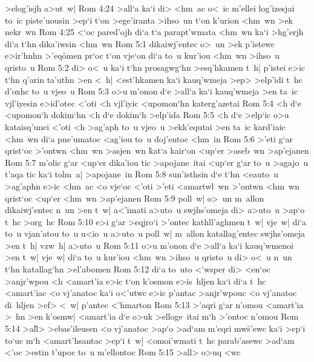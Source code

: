 >elog'isjh
a>ut~w|\bibvsend
\vs Rom 4:24
>all`a
ka`i
di>
<hm~ac
o<~ic
m'ellei
log'izesjai
to~ic
piste'uousin
>ep`i
t`on
>ege'iranta
>ihso~un
t`on
k'urion
<hm~wn
>ek
nekr~wn\bibvsend
\vs Rom 4:25
<`oc
pared'ojh
di`a
t`a
parapt'wmata
<hm~wn
ka`i
>hg'erjh
di`a
t`hn
dika'iwsin
<hm~wn\bibvsend
\vs Rom 5:1
dikaiwj'entec
o>~un
>ek
p'istewc
e>ir'hnhn
>'eq\r{o}men
pr`oc
t`on
vje`on
di`a
to~u
kur'iou
<hm~wn
>ihso~u
qristo~u\bibvsend
\vs Rom 5:2
di>
o<~u
ka`i
t`hn
prosagwg`hn
>esq'hkamen
t~h|
p'istei
e>ic
t`hn
q'arin
ta'uthn
>en
<~h|
<est'hkamen
ka`i
kauq'wmeja
>ep>
>elp'idi
t~hc
d'oxhc
to~u
vjeo~u\bibvsend
\vs Rom 5:3
o>u
m'onon
d`e
>all`a
ka`i
kauq'wmeja
>en
ta~ic
vjl'iyesin
e>id'otec
<'oti
<h
vjl'iyic
<upomon`hn
katerg'azetai\bibvsend
\vs Rom 5:4
<h
d`e
<upomon`h
dokim`hn
<h
d`e
dokim`h
>elp'ida\bibvsend
\vs Rom 5:5
<h
d`e
>elp`ic
o>u
kataisq'unei
<'oti
<h
>ag'aph
to~u
vjeo~u
>ekk'equtai
>en
ta~ic
kard'iaic
<hm~wn
di`a
pne'umatoc
<ag'iou
to~u
doj'entoc
<hm~in\bibvsend
\vs Rom 5:6
>'eti
g`ar
qrist`oc
>'ontwn
<hm~wn
>asjen~wn
\r{k}at`a
kair`on
<up`er
>aseb~wn
>ap'ejanen\bibvsend
\vs Rom 5:7
m'olic
g`ar
<up`er
dika'iou
tic
>apojane~itai
<up`er
g`ar
to~u
>agajo~u
t'aqa
tic
ka`i
tolm~a|
>apojane~in\bibvsend
\vs Rom 5:8
sun'isthsin
d`e
t`hn
<eauto~u
>ag'aphn
e>ic
<hm~ac
<o
vje`oc
<'oti
>'eti
<amartwl~wn
>'ontwn
<hm~wn
qrist`oc
<up`er
<hm~wn
>ap'ejanen\bibvsend
\vs Rom 5:9
poll~w|
o>~un
m~allon
dikaiwj'entec
n~un
>en
t~w|
a<'imati
a>uto~u
swjhs'omeja
di>
a>uto~u
>ap`o
t~hc
>org~hc\bibvsend
\vs Rom 5:10
e>i
g`ar
>eqjro`i
>'ontec
kathll'aghmen
t~w|
vje~w|
di`a
to~u
vjan'atou
to~u
u<io~u
a>uto~u
poll~w|
m~allon
katallag'entec
swjhs'omeja
>en
t~h|
vzw~h|
a>uto~u\bibvsend
\vs Rom 5:11
o>u
m'onon
d`e
>all`a
ka`i
kauq'wmenoi
>en
t~w|
vje~w|
di`a
to~u
kur'iou
<hm~wn
>ihso~u
qristo~u
di>
o<~u
n~un
t`hn
katallag`hn
>el'abomen\bibvsend
\vs Rom 5:12
di`a
to~uto
<'wsper
di>
<en`oc
>anjr'wpou
<h
<amart'ia
e>ic
t`on
k'osmon
e>is~hljen
ka`i
di`a
t~hc
<amart'iac
<o
vj'anatoc
ka`i
o<'utwc
e>ic
p'antac
>anjr'wpouc
<o
vj'anatoc
di~hljen
>ef>
<~w|
p'antec
<'hmarton\bibvsend
\vs Rom 5:13
>'aqri
g`ar
n'omou
<amart'ia
>~hn
>en
k'osmw|
<amart'ia
d`e
o>uk
>elloge~itai
m`h
>'ontoc
n'omou\bibvsend
\vs Rom 5:14
>al\r{l}>
>ebas'ileusen
<o
vj'anatoc
>ap`o
>ad`am
m'eqri
mw\r{s}'ewc
ka`i
>ep`i
to`uc
m`h
<amart'hsantac
>ep`i
t~w|
<omoi'wmati
t~hc
parab'asewc
>ad`am
<'oc
>estin
t'upoc
to~u
m'ellontoc\bibvsend
\vs Rom 5:15
>all>
o>uq
<wc
